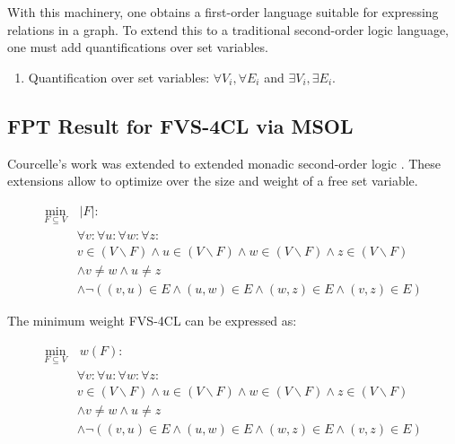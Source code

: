  With this machinery, one obtains a first-order language suitable for expressing relations in a graph. 
To extend this to a traditional second-order logic language, one must add quantifications over set 
variables. 

\begin{enumerate}[label=\textbf{•}]
    \item Quantification over set variables: $\forall V_i, \forall E_i$ and $\exists V_i, \exists E_i$.
\end{enumerate}

\subsection{FPT Result for FVS-4CL via MSOL}

Courcelle's work was extended to extended monadic second-order logic 
\cite{arnborg1991easy,borie1991deterministic,courcelle1993monadic}. These extensions allow to optimize 
over the size and weight of a free set variable.

\begin{equation}
    \label{courcelle:unweighted}
    \begin{aligned}
        \min_{F \subseteq V} & \ |F|: \\
        & \forall v : \forall u : \forall w : \forall z : \\
        & v \in (V \backslash F) \land u \in (V \backslash F) \land w \in (V \backslash F) \land z \in (V \backslash F) \\
        & \land v \neq w \land u \neq z \\
        & \land \neg ((v, u) \in E \land (u, w) \in E \land (w, z) \in E \land (v, z) \in E)
    \end{aligned}
\end{equation}

The minimum weight FVS-4CL can be expressed as:

\begin{equation}
    \label{courcelle:weighted}
    \begin{aligned}
        \min_{F \subseteq V} & \ w(F): \\
        & \forall v : \forall u : \forall w : \forall z : \\
        & v \in (V \backslash F) \land u \in (V \backslash F) \land w \in (V \backslash F) \land z \in (V \backslash F) \\
        & \land v \neq w \land u \neq z \\
        & \land \neg((v, u) \in E \land (u, w) \in E \land (w, z) \in E \land (v, z) \in E)
    \end{aligned}
\end{equation}


